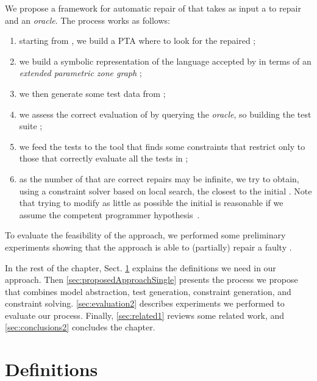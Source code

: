 \begin{tikzborder}{\cite{Gargantini16:validation}}
\begin{tikzborder}{\cite{gargantini_combinatorial_2017}}
\begin{tikzborder}{\cite{gargantini_combinatorial_2017}}
\begin{tikzborder}{\cite{garn2019}}
\begin{tikzborder}{\cite{arcaini2019achieving}}
\begin{tikzborder}{\cite{arcaini2019varivolution}}
We propose a framework for automatic repair of \tas that takes as input a \ta \initTa to repair and an {\it oracle}. The process works as follows:
%
\begin{enumerate}
	\item starting from \initTa, we build a PTA \ptaProc where to look for the repaired \ta;
	\item we build a symbolic representation of the language accepted by \ptaProc in terms of an {\it extended parametric zone graph} \epzg;
	\item we then generate some test data \testData from \epzg;
	\item we assess the correct evaluation of \testData by querying the {\it oracle}, so building the test suite \testSuiteTA;
	\item we feed the tests \testSuiteTA to the \imitator tool that finds some constraints \ptaConstr that restrict \ptaProc only to those \tas that correctly evaluate all the tests in \testSuiteTA;
	\item as the number of \tas that are correct repairs may be infinite, we try to obtain, using a constraint solver based on local search, the \ta \repTa closest to the initial \ta \initTa. Note that trying to modify as little as possible the initial \ta is reasonable if we assume the competent programmer hypothesis~\cite{surveyMutationTestingPapadakis2018}.
\end{enumerate}

To evaluate the feasibility of the approach, we performed some preliminary experiments showing that the approach is able to (partially) repair a faulty \ta. 

In the rest of the chapter, Sect. 
\ref{sec:definitions1} explains the definitions we need in our approach.
Then \ref{sec:proposedApproachSingle} presents the process we propose that combines model abstraction, test generation, constraint generation, and constraint solving.
\ref{sec:evaluation2} describes experiments we performed to evaluate our process.
Finally, \ref{sec:related1} reviews some related work, and \ref{sec:conclusions2} concludes the chapter.

\section{Definitions}\label{sec:definitions1}


\end{tikzborder}
\end{tikzborder}
\end{tikzborder}
\end{tikzborder}
\end{tikzborder}
\end{tikzborder}

